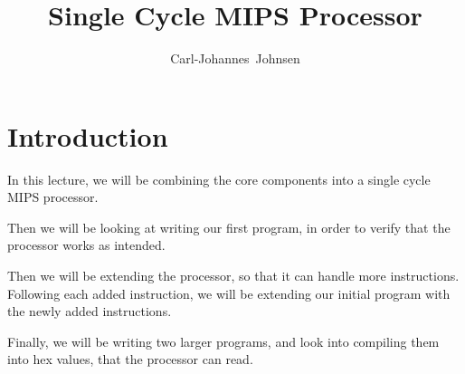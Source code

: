 \documentclass{beamer}
\title{Single Cycle MIPS Processor}
\author[Carl-Johannes Johnsen]{
  \mbox{Carl-Johannes Johnsen}}
\institute{Department of Computer Science\\
           University of Copenhagen}
\begin{document}
\frame{\titlepage}

\section{Introduction}
\begin{frame}
    In this lecture, we will be combining the core components into a single
    cycle MIPS processor.

    \vspace{\baselineskip}
    Then we will be looking at writing our first program, in order to verify
    that the processor works as intended.

    \vspace{\baselineskip}
    Then we will be extending the processor, so that it can handle more
    instructions. Following each added instruction, we will be extending our
    initial program with the newly added instructions.

    \vspace{\baselineskip}
    Finally, we will be writing two larger programs, and look into compiling
    them into hex values, that the processor can read.
\end{frame}
\end{document}
